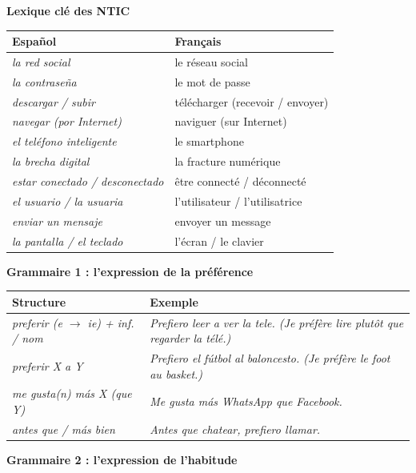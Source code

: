 \documentclass[11pt]{article}
\newcommand{\esp}[1]{\ifmmode\text{\textit{#1}}\else\begingroup\selectlanguage{spanish}\itshape #1\endgroup\fi}
\begin{document}
\begin{bilan}
\textbf{Lexique clé des NTIC}

\begin{center}
\begin{tabularx}{\linewidth}{|X|X|}\hline
\rowcolor{popblueL} Español & Français \\ \hline
\esp{la red social} & le réseau social \\ \hline
\esp{la contraseña} & le mot de passe \\ \hline
\esp{descargar / subir} & télécharger (recevoir / envoyer) \\ \hline
\esp{navegar (por Internet)} & naviguer (sur Internet) \\ \hline
\esp{el teléfono inteligente} & le smartphone \\ \hline
\esp{la brecha digital} & la fracture numérique \\ \hline
\esp{estar conectado / desconectado} & être connecté / déconnecté \\ \hline
\esp{el usuario / la usuaria} & l'utilisateur / l'utilisatrice \\ \hline
\esp{enviar un mensaje} & envoyer un message \\ \hline
\esp{la pantalla / el teclado} & l'écran / le clavier \\ \hline
\end{tabularx}
\end{center}

\textbf{Grammaire 1 : l'expression de la préférence}

\begin{center}
\begin{tabularx}{\linewidth}{|X|X|}\hline
\rowcolor{popgreenL} Structure & Exemple \\ \hline
\esp{preferir (e $\to$ ie) + inf. / nom} & \esp{Prefiero leer a ver la tele.} (Je préfère lire plutôt que regarder la télé.) \\ \hline
\esp{preferir X a Y} & \esp{Prefiero el fútbol al baloncesto.} (Je préfère le foot au basket.) \\ \hline
\esp{me gusta(n) más X (que Y)} & \esp{Me gusta más WhatsApp que Facebook.} \\ \hline
\esp{antes que / más bien} & \esp{Antes que chatear, prefiero llamar.} \\ \hline
\end{tabularx}
\end{center}

\textbf{Grammaire 2 : l'expression de l'habitude}


\end{bilan}
\end{document}
